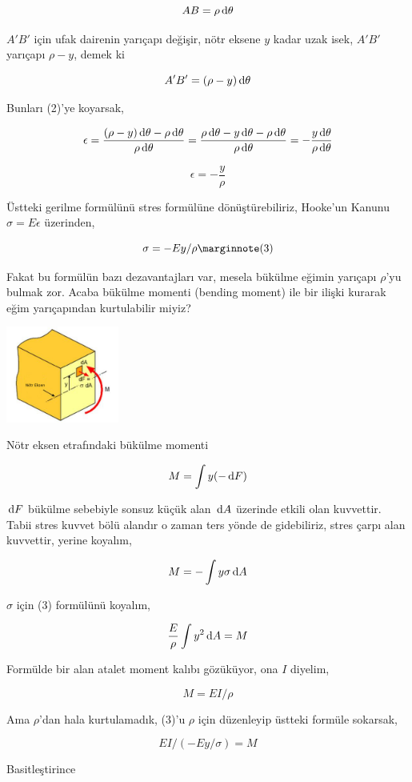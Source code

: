 \documentclass[12pt,fleqn]{article}\usepackage{../../common}
\begin{document}
$$
AB = \rho \,\mathrm{d} \theta
$$

$A'B'$ için ufak dairenin yarıçapı değişir, nötr eksene $y$ kadar uzak isek,
$A'B'$ yarıçapı $\rho - y$, demek ki 

$$
A'B' = (\rho - y) \,\mathrm{d} \theta
$$

Bunları (2)'ye koyarsak,

$$
\epsilon = \frac{(\rho - y) \,\mathrm{d} \theta - \rho \,\mathrm{d} \theta}{\rho \,\mathrm{d}\theta} =
\frac{\rho \,\mathrm{d}\theta - y \,\mathrm{d}\theta - \rho \,\mathrm{d}\theta}{\rho \,\mathrm{d}\theta} =
- \frac{y \,\mathrm{d}\theta}{\rho \,\mathrm{d}\theta}
$$

$$
\epsilon = - \frac{y}{\rho}
$$

Üstteki gerilme formülünü stres formülüne dönüştürebiliriz, Hooke'un Kanunu
$\sigma = E \epsilon$ üzerinden,

$$
\sigma = -E y / \rho
\mlabel{3}
$$

Fakat bu formülün bazı dezavantajları var, mesela bükülme eğimin yarıçapı
$\rho$'yu bulmak zor. Acaba bükülme momenti (bending moment) ile bir ilişki
kurarak eğim yarıçapından kurtulabilir miyiz?

\includegraphics[width=10em]{phy_020_strs_00_05.jpg}

Nötr eksen etrafındaki bükülme momenti

$$
M = \int y (-\,\mathrm{d} F)
$$


$\,\mathrm{d} F$ bükülme sebebiyle sonsuz küçük alan $\,\mathrm{d} A$ üzerinde etkili olan
kuvvettir. Tabii stres kuvvet bölü alandır o zaman ters yönde de gidebiliriz,
stres çarpı alan kuvvettir, yerine koyalım,

$$
M = -\int y \sigma \,\mathrm{d} A
$$

$\sigma$ için (3) formülünü koyalım,

$$
\frac{E}{\rho} \int y^2 \,\mathrm{d} A = M
$$

Formülde bir alan atalet moment kalıbı gözüküyor, ona $I$ diyelim,

$$
M = E I / \rho
$$

Ama $\rho$'dan hala kurtulamadık, (3)'u $\rho$ için düzenleyip üstteki formüle
sokarsak,

$$
EI / (-Ey / \sigma )  = M
$$

Basitleştirince
\end{document}
